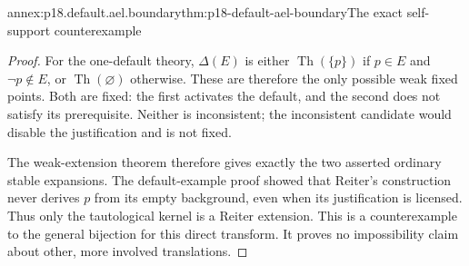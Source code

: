 \begin{annexitem}{annex:p18.default.ael.boundary}{thm:p18-default-ael-boundary}{The exact self-support counterexample}
\begin{proof}
For the one-default theory,
\(\Delta(E)\) is either
\(\operatorname{Th}(\{p\})\)
if \(p\in E\) and
\(\neg p\notin E\), or
\(\operatorname{Th}(\varnothing)\)
otherwise. These are
therefore the only
possible weak fixed
points. Both are fixed:
the first activates the
default, and the second
does not satisfy its
prerequisite. Neither
is inconsistent; the
inconsistent candidate
would disable the
justification and is
not fixed.

The weak-extension theorem
therefore gives exactly
the two asserted ordinary
stable expansions. The
default-example proof
showed that Reiter's
construction never derives
\(p\) from its empty
background, even when
its justification is
licensed. Thus only
the tautological kernel
is a Reiter extension.
This is a counterexample
to the general bijection
for this direct transform.
It proves no impossibility
claim about other, more
involved translations.
\end{proof}
\end{annexitem}
